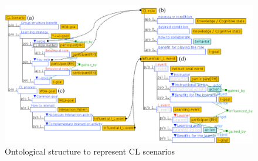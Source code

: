 \begin{figure}[htb]
 \caption{Ontological structure to represent CL scenarios}
 \label{fig:ontological-structure-cl-scenario}
 \centering
 \includegraphics[width=1\textwidth]{images/chap-ontogacles1/ontological-structure-cl-scenario.png}
\end{figure}

